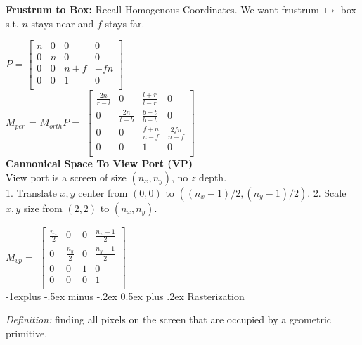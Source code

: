 \documentclass[letterpaper, 8pt]{extarticle}
\makeatletter
\renewcommand{\section}{\@startsection{section}{1}{0mm}%
                                {-1explus -.5ex minus -.2ex}%
                                {0.5ex plus .2ex}%
                                {\normalfont\normalsize\bfseries}}
\makeatother
\begin{document}
\begin{multicols*}{4}
\textbf{Frustrum to Box:}
Recall Homogenous Coordinates. We want frustrum $\mapsto$ box s.t. $n$ stays near and $f$ stays far.

$P$ =
\(
\begin{bmatrix}
    n & 0 & 0   & 0   \\
    0 & n & 0   & 0   \\
    0 & 0 & n+f & -fn \\
    0 & 0 & 1   & 0   \\
\end{bmatrix}
\)\\
$M_{per}$ = $M_{orth}P =$
\(
\begin{bmatrix}
    \frac{2n}{r-l} & 0              & \frac{l+r}{l-r} & 0               \\
    0              & \frac{2n}{t-b} & \frac{b+t}{b-t} & 0               \\
    0              & 0              & \frac{f+n}{n-f} & \frac{2fn}{n-f} \\
    0              & 0              & 1               & 0               \\
\end{bmatrix}
\)\\

\textbf{Cannonical Space To View Port (VP)}\\

View port is a screen of size $(n_x, n_y)$, no $z$ depth.\\
1. Translate $x,y$ center from $(0,0)$ to $((n_x-1)/2, (n_y-1)/2)$.
2. Scale $x,y$ size from $(2,2)$ to $(n_x, n_y)$.

$M_{vp} = $
\(
\begin{bmatrix}
    \frac{n_x}{2} & 0             & 0 & \frac{n_x-1}{2} \\
    0             & \frac{n_y}{2} & 0 & \frac{n_y-1}{2} \\
    0             & 0             & 1 & 0               \\
    0             & 0             & 0 & 1               \\
\end{bmatrix}
\)\\



\section{Rasterization}

\textit{Definition:} finding all pixels on the screen that are occupied by a geometric primitive.


\end{multicols*}
\end{document}
